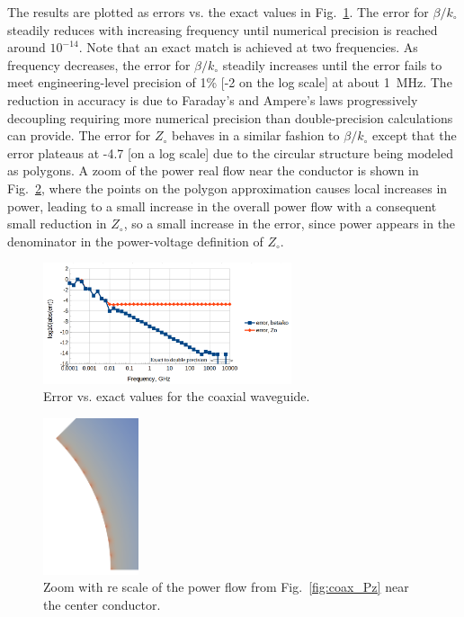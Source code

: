\documentclass[titlepage]{article}
\renewcommand\_{\textunderscore\linebreak[1]}
\begin{document}
The results are plotted as errors vs. the exact values in Fig.~\ref{fig:coax_results}. The error for $\beta/k_{\circ}$ steadily reduces with increasing frequency until numerical precision is reached around $10^{-14}$.  Note that an exact match is achieved at two frequencies.  As frequency decreases, the error for $\beta/k_{\circ}$ steadily increases until the error fails to meet engineering-level precision of 1\% [-2 on the log scale] at about 1~MHz.  The reduction in accuracy is due to Faraday's and Ampere's laws progressively decoupling requiring more numerical precision than double-precision calculations can provide.  The error for $Z_{\circ}$ behaves in a similar fashion to $\beta/k_{\circ}$ except that the error plateaus at -4.7 [on a log scale] due to the circular structure being modeled as polygons. A zoom of the power real flow near the conductor is shown in Fig.~\ref{fig:coax_Pz_zoom}, where the points on the polygon approximation causes local increases in power, leading to a small increase in the overall power flow with a consequent small reduction in $Z_{\circ}$, so a small increase in the error, since power appears in the denominator in the power-voltage definition of $Z_{\circ}$.
\begin{figure}[H]
  \centering
  \includegraphics[width=0.65\textwidth]{../regression/OpenParEM2D/coaxEighth_study/screenshots/coax_results}
  \caption{Error vs. exact values for the coaxial waveguide.}
  \label{fig:coax_results}
\end{figure}
\begin{figure}[H]
  \centering
  \includegraphics[width=0.25\textwidth]{../regression/OpenParEM2D/coaxEighth_study/screenshots/coax_Pz_zoom}
  \caption{Zoom with re scale of the power flow from Fig.~\ref{fig:coax_Pz} near the center conductor.}
  \label{fig:coax_Pz_zoom}
\end{figure}
\end{document}
